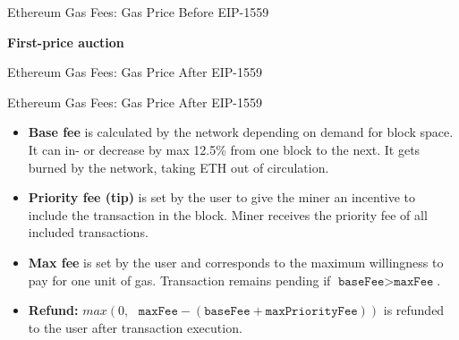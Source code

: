 \documentclass[handout]{beamer}
\begin{document}
\begin{frame}{Ethereum Gas Fees: Gas Price Before EIP-1559}
	\begin{center}
		\begin{tikzpicture}
			
		\end{tikzpicture}
	\end{center}
	
	\textbf{First-price auction}
	\begin{itemize}
	\end{itemize}
\end{frame}

\begin{frame}{Ethereum Gas Fees: Gas Price After EIP-1559}
	\begin{center}
		\begin{tikzpicture}
			
		\end{tikzpicture}
	\end{center}	
\end{frame}

\begin{frame}{Ethereum Gas Fees: Gas Price After EIP-1559}
	\begin{itemize}
		\item \textbf{Base fee} is calculated by the network depending on demand for block space. It can in- or decrease by max 12.5\% from one block to the next. It gets burned by the network, taking ETH out of circulation.
		\vspace{1 em}
		\item \textbf{Priority fee (tip)} is set by the user to give the miner an incentive to include the transaction in the block. Miner receives the priority fee of all included transactions.
		\vspace{1 em}
		\item \textbf{Max fee} is set by the user and corresponds to the maximum willingness to pay for one unit of gas. Transaction remains pending if $\texttt{baseFee}  > \texttt{maxFee} $.
		\vspace{1 em}
		\item \textbf{Refund:} $max \left(0, \text{ }\texttt{maxFee} - (\texttt{baseFee}  + \texttt{maxPriorityFee} )\right)$ is refunded to the user after transaction execution. 
	\end{itemize}	
\end{frame}
\end{document}
